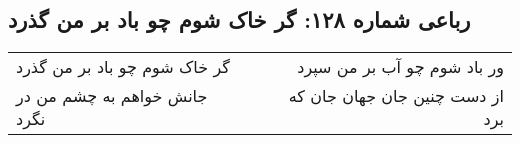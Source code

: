 \begin{center}
\section*{رباعی شماره ۱۲۸: گر خاک شوم چو باد بر من گذرد}
\label{sec:sh128}
\begin{longtable}{l p{0.5cm} r}
گر خاک شوم چو باد بر من گذرد
&&
ور باد شوم چو آب بر من سپرد
\\
جانش خواهم به چشم من در نگرد
&&
از دست چنین جان جهان جان که برد
\\
\end{longtable}
\end{center}
